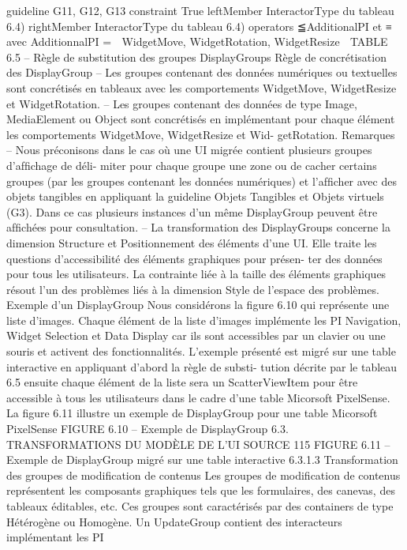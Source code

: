 \documentclass{article}
\begin{document}
guideline
G11, G12, G13
constraint
True
leftMember
InteractorType du tableau 6.4)
rightMember
InteractorType du tableau 6.4)
operators
≦AdditionalPI et ≡
avec AdditionnalPI =
 WidgetMove, WidgetRotation,
WidgetResize

TABLE 6.5 – Règle de substitution des groupes DisplayGroups
Règle de concrétisation des DisplayGroup
– Les groupes contenant des données numériques ou textuelles sont concrétisés en tableaux avec
les comportements WidgetMove, WidgetResize et WidgetRotation.
– Les groupes contenant des données de type Image, MediaElement ou Object sont concrétisés
en implémentant pour chaque élément les comportements WidgetMove, WidgetResize et Wid-
getRotation.
Remarques
– Nous préconisons dans le cas où une UI migrée contient plusieurs groupes d’afﬁchage de déli-
miter pour chaque groupe une zone ou de cacher certains groupes (par les groupes contenant les
données numériques) et l’afﬁcher avec des objets tangibles en appliquant la guideline Objets
Tangibles et Objets virtuels (G3). Dans ce cas plusieurs instances d’un même DisplayGroup
peuvent être afﬁchées pour consultation.
– La transformation des DisplayGroups concerne la dimension Structure et Positionnement des
éléments d’une UI. Elle traite les questions d’accessibilité des éléments graphiques pour présen-
ter des données pour tous les utilisateurs. La contrainte liée à la taille des éléments graphiques
résout l’un des problèmes liés à la dimension Style de l’espace des problèmes.
Exemple d’un DisplayGroup
Nous considérons la ﬁgure 6.10 qui représente une liste d’images.
Chaque élément de la liste d’images implémente les PI Navigation, Widget Selection et Data Display
car ils sont accessibles par un clavier ou une souris et activent des fonctionnalités.
L’exemple présenté est migré sur une table interactive en appliquant d’abord la règle de substi-
tution décrite par le tableau 6.5 ensuite chaque élément de la liste sera un ScatterViewItem pour être
accessible à tous les utilisateurs dans le cadre d’une table Micorsoft PixelSense. La ﬁgure 6.11 illustre
un exemple de DisplayGroup pour une table Micorsoft PixelSense
FIGURE 6.10 – Exemple de DisplayGroup
6.3. TRANSFORMATIONS DU MODÈLE DE L’UI SOURCE
115
FIGURE 6.11 – Exemple de DisplayGroup migré sur une table interactive
6.3.1.3
Transformation des groupes de modiﬁcation de contenus
Les groupes de modiﬁcation de contenus représentent les composants graphiques tels que les
formulaires, des canevas, des tableaux éditables, etc. Ces groupes sont caractérisés par des containers
de type Hétérogène ou Homogène. Un UpdateGroup contient des interacteurs implémentant les PI
\end{document}
